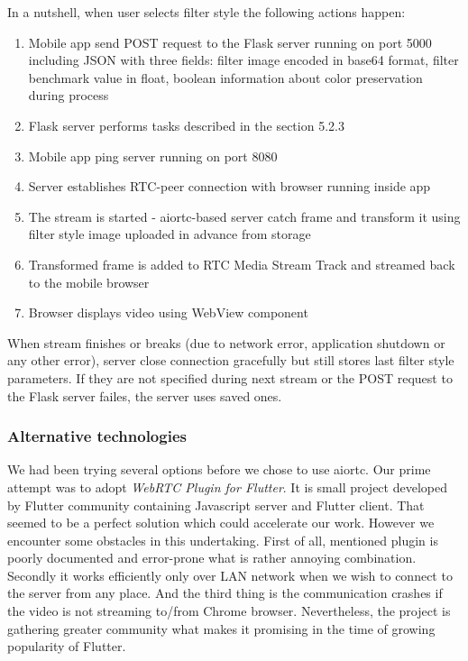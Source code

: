 \documentclass[../Main.tex]{subfiles}
\begin{document}
    In a nutshell, when user selects filter style the following actions happen:
    \begin{enumerate}
    \item Mobile app send POST request to the Flask server running on port 5000 including JSON with three fields: filter image encoded in base64 format, filter benchmark value in float, boolean information about color preservation during process 
    \item Flask server performs tasks described in the section 5.2.3
    \item Mobile app ping server running on port 8080
    \item Server establishes RTC-peer connection with browser running inside app
    \item The stream is started - aiortc-based server catch frame and transform it using filter style image uploaded in advance from storage
    \item Transformed frame is added to RTC Media Stream Track and streamed back to the mobile browser
    \item Browser displays video using WebView component 
    \end{enumerate}
    
    When stream finishes or breaks (due to network error, application shutdown or any other error), server close connection gracefully but still stores last filter style parameters. If they are not specified during next stream or the POST request to the Flask server failes, the server uses saved ones. 
    
    \subsubsection{Alternative technologies}
    We had been trying several options before we chose to use aiortc. Our prime attempt was to adopt \textit{WebRTC Plugin for Flutter}. It is small project developed by Flutter community containing Javascript server and Flutter client. That seemed to be a perfect solution which could accelerate our work.
    However we encounter some obstacles in this undertaking. First of all, mentioned plugin is poorly documented and error-prone what is rather annoying combination. Secondly it works efficiently only over LAN network when we wish to connect to the server from any place. And the third thing is the communication crashes if the video is not streaming to/from Chrome browser. Nevertheless, the project is gathering greater community what makes it promising in the time of growing popularity of Flutter.
   
\end{document}
